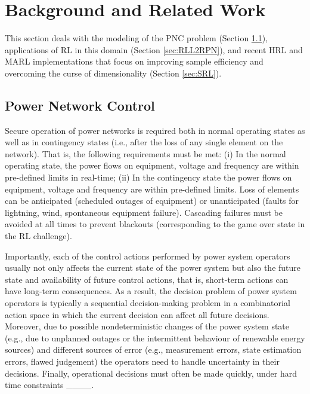 \section{Background and Related Work}
\label{sec:background}
This section deals with the modeling of the PNC problem (Section \ref{sec:L2RPN}), applications of RL in this domain (Section \ref{sec:RLL2RPN}), and recent HRL and MARL implementations that focus on improving sample efficiency and overcoming the curse of dimensionality (Section \ref{sec:SRL}).

\subsection{Power Network Control}\label{sec:L2RPN}
Secure operation of power networks is required both in normal operating states as well as in contingency states (i.e., after the loss of any single element on the network). That is, the following requirements must be met: (i) In the normal operating state, the power flows on equipment, voltage and frequency are within pre-defined limits in real-time; (ii) In the contingency state the power flows on equipment, voltage and frequency are within pre-defined limits. Loss of elements can be anticipated (scheduled outages of
equipment) or unanticipated (faults for lightning, wind, spontaneous equipment failure). Cascading failures
must be avoided at all times to prevent blackouts (corresponding to the game over state in the RL challenge).

Importantly, each of the control actions performed by power system operators usually not only affects the
current state of the power system but also the future state and availability of future control actions, that
is, short-term actions can have long-term consequences. As a result, the decision problem of power system
operators is typically a sequential decision-making problem in a combinatorial action space in which the current decision can affect all
future decisions. Moreover, due to possible nondeterministic changes of the power system state (e.g., due
to unplanned outages or the intermittent behaviour of renewable energy sources) and different sources of
error (e.g., measurement errors, state estimation errors, flawed judgement) the operators need to handle
uncertainty in their decisions. Finally, operational decisions must often be made quickly, under hard time
constraints ____.


